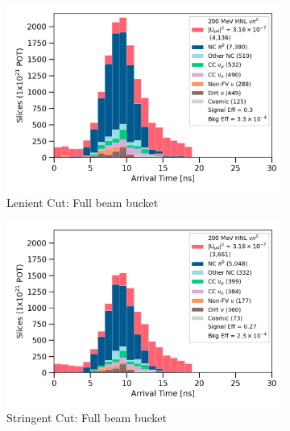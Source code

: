 \begin{figure}[b!]
	\hfill
	\begin{subfigure}[b]{0.495\textwidth}   
            \centering 
            \includegraphics[width=\textwidth]{bb_lenient_full}
            \caption{Lenient Cut: Full beam bucket}%
	    \label{fig:bb_full_loose}
        \end{subfigure}
        \hfill
	\begin{subfigure}[b]{0.495\textwidth}   
            \centering 
            \includegraphics[width=\textwidth]{bb_stringent_full}
            \caption{Stringent Cut: Full beam bucket}%
	    \label{fig:bb_full_strict}
        \end{subfigure}
	\hfill
        \begin{subfigure}[b]{0.495\textwidth}   
            \centering 

\end{subfigure}
\end{figure}
